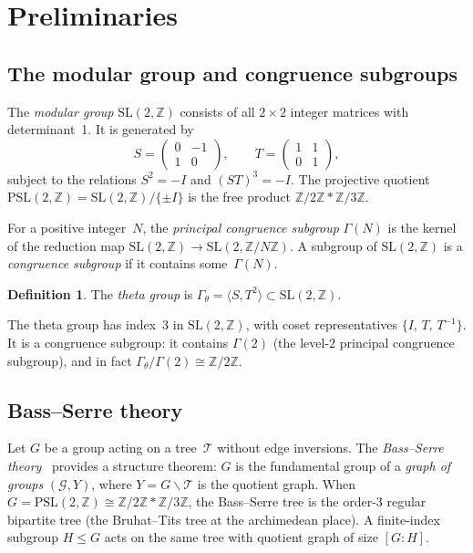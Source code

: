 \documentclass[12pt]{amsart}
\theoremstyle{definition}
\newtheorem{definition}[theorem]{Definition}
\theoremstyle{remark}
\newcommand{\SL}{\mathrm{SL}}
\newcommand{\PSL}{\mathrm{PSL}}
\newcommand{\Z}{\mathbb{Z}}
\newcommand{\Gtheta}{\Gamma_\theta}
\begin{document}
\section{Preliminaries}\label{sec:prelim}

\subsection{The modular group and congruence subgroups}

The \emph{modular group} $\SL(2,\Z)$ consists of all $2\times 2$ integer
matrices with determinant~1.  It is generated by
\[
S = \begin{pmatrix} 0 & -1\\ 1 & 0\end{pmatrix}, \qquad
T = \begin{pmatrix} 1 & 1\\ 0 & 1\end{pmatrix},
\]
subject to the relations $S^2 = -I$ and $(ST)^3 = -I$.
The projective quotient $\PSL(2,\Z) = \SL(2,\Z)/\{\pm I\}$ is the free
product $\Z/2\Z * \Z/3\Z$.

For a positive integer~$N$, the \emph{principal congruence subgroup}
$\Gamma(N)$ is the kernel of the reduction map
$\SL(2,\Z) \to \SL(2,\Z/N\Z)$.
A subgroup of $\SL(2,\Z)$ is a \emph{congruence subgroup} if it
contains some~$\Gamma(N)$.

\begin{definition}
The \emph{theta group} is
$\Gtheta = \langle S, T^2\rangle \subset \SL(2,\Z)$.
\end{definition}

The theta group has index~3 in $\SL(2,\Z)$, with coset representatives
$\{I,\, T,\, T^{-1}\}$.  It is a congruence subgroup: it contains
$\Gamma(2)$ (the level-2 principal congruence subgroup), and in fact
$\Gtheta/\Gamma(2) \cong \Z/2\Z$.

\subsection{Bass--Serre theory}

Let $G$ be a group acting on a tree~$\mathcal{T}$ without edge inversions.
The \emph{Bass--Serre theory}~\cite{serre-trees} provides a structure
theorem: $G$ is the fundamental group of a \emph{graph of groups}
$(\mathcal{G}, Y)$, where $Y = G\backslash\mathcal{T}$ is the quotient
graph.  When $G = \PSL(2,\Z) \cong \Z/2\Z * \Z/3\Z$, the Bass--Serre
tree is the order-3 regular bipartite tree (the Bruhat--Tits tree at the
archimedean place).  A finite-index subgroup $H \le G$ acts on the same
tree with quotient graph of size $[G:H]$.
\end{document}
